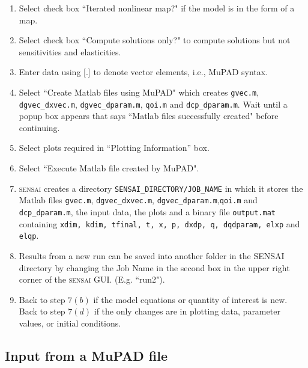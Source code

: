 \documentclass[12pt]{article}
\newcommand{\sensai}{\textsc{sensai}}
\begin{document}
\begin{enumerate}
    \item Select check box ``Iterated nonlinear map?" if the model is in the form of a map.
    \item Select check box ``Compute solutions only?" to compute solutions but not
          sensitivities and elasticities.
    \item Enter data using [.] to denote vector elements, i.e., MuPAD syntax.
    \item Select ``Create M{\sc atlab} files using MuPAD" which creates {\tt gvec.m}, {\tt dgvec\_dxvec.m},
      {\tt dgvec\_dparam.m}, {\tt qoi.m} and {\tt dcp\_dparam.m}.  Wait until a popup box appears that says ``M{\sc atlab} files successfully created" before continuing.
    \item Select plots required in ``Plotting Information'' box.
    \item Select ``Execute M{\sc atlab} file created by MuPAD".
    \item {\sensai} creates a directory {\tt SENSAI\_DIRECTORY/JOB\_NAME} in which it stores the M{\sc atlab} files {\tt gvec.m}, {\tt dgvec\_dxvec.m}, {\tt dgvec\_dparam.m},{\tt qoi.m} and {\tt dcp\_dparam.m}, the input data, the plots and a binary file {\tt output.mat} containing {\tt xdim, kdim, tfinal, t, x, p, dxdp, q, dqdparam, elxp} and {\tt elqp}.
    \item Results from a new run can be saved into another folder in the SENSAI directory by changing the Job Name in the second box in the upper right corner of the {\sensai} GUI.  (E.g. ``run2").
    \item Back to step $7(b)$ if the model equations or quantity of interest is new.  Back to step $7(d)$ if the only changes are in plotting data, parameter values, or initial conditions.
\end{enumerate}


\subsection{Input from a MuPAD file}
\end{document}
